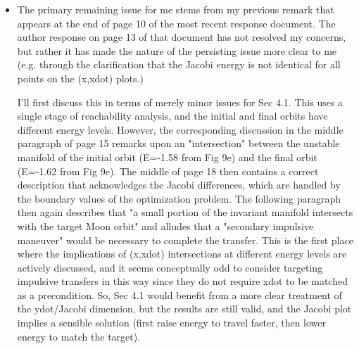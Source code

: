 \documentclass[11pt]{article}
\begin{document}
\begin{itemize}
    \item 
        \begin{itshape}
            The primary remaining issue for me stems from my previous remark that
            appears at the end of page 10 of the most recent response document.  The
            author response on page 13 of that document has not resolved my concerns,
            but rather it has made the nature of the persisting issue more clear to me
            (e.g. through the clarification that the Jacobi energy is not identical for
            all points on the (x,xdot) plots.)

            I'll first discuss this in terms of merely minor issues for Sec 4.1.  This
            uses a single stage of reachability analysis, and the initial and final
            orbits have different energy levels.  However, the corresponding discussion
            in the middle paragraph of page 15 remarks upon an "intersection" between
            the unstable manifold of the initial orbit (E=-1.58 from Fig 9e) and the
            final orbit (E=-1.62 from Fig 9e).  The middle of page 18 then contains a
            correct description that acknowledges the Jacobi differences, which are
            handled by the boundary values of the optimization problem.  The following
            paragraph then again describes that "a small portion of the invariant
            manifold intersects with the target Moon orbit" and alludes that a
            "secondary impulsive maneuver" would be necessary to complete the transfer.
            This is the first place where the implications of (x,xdot) intersections at
            different energy levels are actively discussed, and it seems conceptually
            odd to consider targeting impulsive transfers in this way since they do not
            require xdot to be matched as a precondition.  So, Sec 4.1 would benefit
            from a more clear treatment of the ydot/Jacobi dimension, but the results
            are still valid, and the Jacobi plot implies a sensible solution (first
            raise energy to travel faster, then lower energy to match the target).
        \end{itshape}


\end{itemize}
\end{document}
